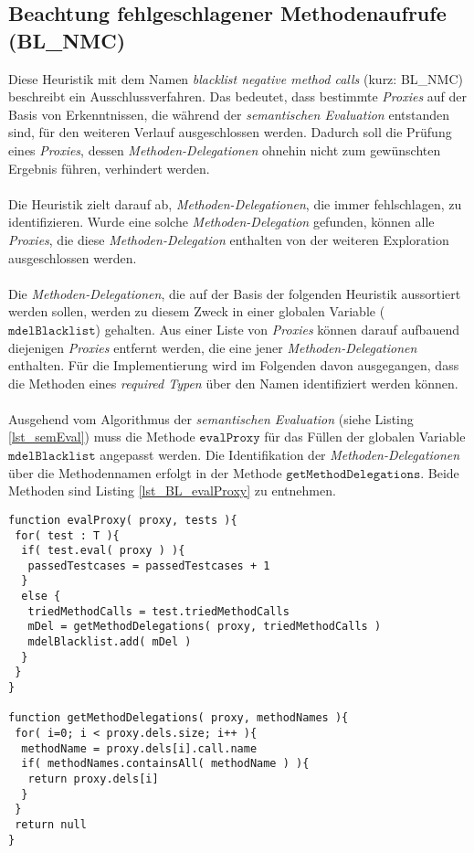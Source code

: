 \subsection{Beachtung fehlgeschlagener Methodenaufrufe (BL\_NMC)}\label{sec_bl_nmc}
Diese \Gls{Heuristik} mit dem Namen \emph{blacklist negative method calls} (kurz: BL\_NMC) beschreibt ein Ausschlussverfahren. Das bedeutet, dass bestimmte \emph{Proxies} auf der Basis von Erkenntnissen, die während der \emph{semantischen Evaluation} entstanden sind, für den weiteren Verlauf ausgeschlossen werden. Dadurch soll die Prüfung eines \emph{Proxies}, dessen \emph{Methoden-Delegationen} ohnehin nicht zum gewünschten Ergebnis führen, verhindert werden.
\\\\
Die Heuristik zielt darauf ab, \emph{Methoden-Delegationen}, die immer fehlschlagen, zu identifizieren. Wurde eine solche \emph{Methoden-Delegation} gefunden, können alle \emph{Proxies}, die diese \emph{Methoden-Delegation} enthalten von der weiteren Exploration ausgeschlossen werden.
\\\\
Die \emph{Methoden-Delegationen}, die auf der Basis der folgenden \Gls{Heuristik} aussortiert werden sollen, werden zu diesem Zweck in einer globalen Variable ($\texttt{mdelBlacklist}$) gehalten. Aus einer Liste von \emph{Proxies} können darauf aufbauend diejenigen \emph{Proxies} entfernt werden, die eine jener \emph{Methoden-Delegationen} enthalten. Für die Implementierung wird im Folgenden davon ausgegangen, dass die Methoden eines \emph{required Typen} über den Namen identifiziert werden können.
\\\\
Ausgehend vom Algorithmus der \emph{semantischen Evaluation} (siehe Listing \ref{lst_semEval}) muss die Methode $\texttt{evalProxy}$ für das Füllen der globalen Variable $\texttt{mdelBlacklist}$ angepasst werden. Die Identifikation der \emph{Methoden-Delegationen} über die Methodennamen erfolgt in der Methode $\texttt{getMethodDelegations}$. Beide Methoden sind Listing \ref{lst_BL_evalProxy} zu entnehmen.
\begin{lstlisting}[style = pseudo, caption = Evaluierung einzelner Proxies mit BL\_MNC, captionpos = b, label = lst_BL_evalProxy]
function evalProxy( proxy, tests ){
 for( test : T ){	
  if( test.eval( proxy ) ){
   passedTestcases = passedTestcases + 1
  }
  else {
   triedMethodCalls = test.triedMethodCalls
   mDel = getMethodDelegations( proxy, triedMethodCalls )
   mdelBlacklist.add( mDel )
  }		
 }
}

function getMethodDelegations( proxy, methodNames ){
 for( i=0; i < proxy.dels.size; i++ ){
  methodName = proxy.dels[i].call.name
  if( methodNames.containsAll( methodName ) ){
   return proxy.dels[i]
  }
 }
 return null
}
\end{lstlisting}
